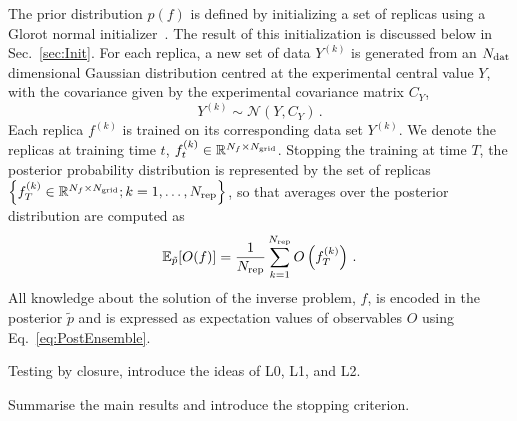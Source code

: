 The prior distribution $p(f)$ is defined by initializing a set of replicas using a Glorot normal 
initializer~\cite{glorot2010understanding}.
The result of this initialization is discussed below in Sec.~\ref{sec:Init}.
For each replica, a new set of data $Y^{(k)}$ is generated from an $N_{\mathrm{dat}}$ dimensional Gaussian distribution
centred at the experimental central value $Y$, with the covariance given by the experimental covariance
matrix $C_Y$,
\begin{equation}
    \label{eq:ExpReplicaDistr}
    Y^{(k)} \sim \mathcal{N}\left(Y, C_Y\right)\, .
\end{equation}
Each replica $f^{(k)}$ is trained on its corresponding data set $Y^{(k)}$. We denote the replicas at training time $t$,
$f^{(k)}_{t} \in \mathbb{R}^{N_{f}\times N_{\mathrm{grid}}}$. Stopping the training at time $T$, the posterior probability
distribution is represented by the set of replicas
$\left\{f^{(k)}_{T}\in \mathbb{R}^{N_{f}\times N_{\mathrm{grid}}}; k=1, \ldots, N_{\rm rep}\right\}$, so that averages over the posterior
distribution are computed as
\begin{equation}
    \label{eq:PostEnsemble}
    \mathbb{E}_{\tilde{p}}[O(f)] = \frac{1}{N_{\rm rep}} \sum_{k=1}^{N_{\rm rep}}
        O\left(f^{(k)}_{T}\right)\, .
\end{equation}
All knowledge about the solution of the inverse problem, $f$, is encoded in the posterior
$\tilde{p}$ and is expressed as expectation values of observables $O$ using
Eq.~\eqref{eq:PostEnsemble}.

Testing by closure, introduce the ideas of L0, L1, and L2.

Summarise the main results and introduce the stopping criterion. 

\FloatBarrier
